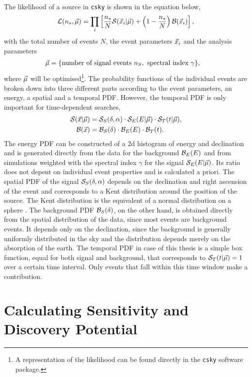 The likelihood of a source in \texttt{csky} is shown in the equation below,
\begin{equation}
  \mathcal{L}(n_s,\vec{\mu})
  = \prod_i \left[ 
    \frac{n_s}{N} \mathcal{S}(\vec{x}_i|\vec{\mu})
    + \left( 1 - \frac{n_s}{N} \right) \mathcal{B}(\vec{x}_i)
   \right],
  \label{eq:lh}
\end{equation}
with the total number of events $N$, the event parameters $\vec{x}_i$ and the analysis parameters
\begin{align}
  \vec{\mu} &= \{\text{number of signal events }n_S, \text{ spectral index }\gamma\},
\end{align}
where $\vec{\mu}$ will be optimised\footnote{A representation of the likelihood can be found directly in the \texttt{csky} software package.}.
The probability functions of the individual events are broken down into three different parts according to the event parameters, an energy, a spatial and a temporal PDF.
However, the temporal PDF is only important for time-dependent searches,
\begin{align}
  \mathcal{S}(\vec{x}|\vec{\mu})
  &= \mathcal{S}_S(\delta,\alpha)
  \cdot \mathcal{S}_E(E|\vec{\mu})
  \cdot \mathcal{S}_T(t|\vec{\mu}), \label{eq:signal_pdfs}
  \\
  \mathcal{B}(\vec{x})
  &= \mathcal{B}_S(\delta)
  \cdot \mathcal{B}_E(E)
  \cdot \mathcal{B}_T(t).
  \label{eq:background_pdfs}
\end{align}
The energy PDF can be constructed of a 2d histogram of energy and declination and is generated directly from the data for the background $\mathcal{B}_E(E)$ and from simulations weighted with the spectral index $\gamma$ for the signal $\mathcal{S}_E(E|\vec{\mu})$.
Its ratio does not depent on individual event properties and is calculated a priori.
The spatial PDF of the signal $\mathcal{S}_S(\delta,\alpha)$ depends on the declination and right ascension of the event and corresponds to a Kent distribution around the position of the source.
The Kent distribution is the equivalent of a normal distribution on a sphere \cite{kent}.
The background PDF $\mathcal{B}_S(\delta)$, on the other hand, is obtained directly from the spatial distribution of the data, since most events are background events.
It depends only on the declination, since the background is generally uniformly distributed in the sky and the distribution depends merely on the absorption of the earth.
The temporal PDF in case of this thesis is a simple box function, equal for both signal and background, that corresponds to $\mathcal{S}_T(t|\vec{\mu})=1$ over a certain time interval.
Only events that fall within this time window make a contribution.

\section{Calculating Sensitivity and Discovery Potential}

